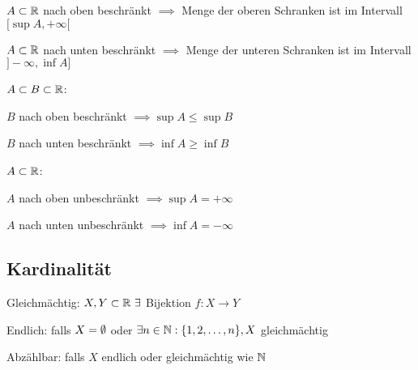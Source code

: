 \begin{compactenum}
    \item $A \subset \mathbb{R}$ nach oben beschränkt $\implies$ Menge der oberen Schranken ist  im Intervall $[\sup A, +\infty[$
    \item $A \subset \mathbb{R}$ nach unten beschränkt $\implies$ Menge der unteren Schranken ist  im Intervall $]-\infty, \inf A]$
\end{compactenum}

$A \subset  B \subset  \mathbb{R}$:
\begin{compactenum}
    \item $B$ nach oben beschränkt $\implies \sup A \le \sup B$
    \item $B$ nach unten beschränkt $\implies \inf A \ge \inf B$
\end{compactenum}

$A \subset \mathbb{R}$:
\begin{compactenum}
    \item $A$ nach oben unbeschränkt $\implies \sup A = +\infty$
    \item $A$ nach unten unbeschränkt $\implies \inf A = -\infty$
\end{compactenum}

\subsection{Kardinalität}
\begin{compactdesc}
    \item[Gleichmächtig:] $X,Y \subset \mathbb{R} \ \exists$ Bijektion $f : X \to Y$
    \item[Endlich:] falls $X = \emptyset$ oder $\exists n \in \mathbb{N}: \{1, 2, \ldots, n\}, X$ gleichmächtig
    \item[Abzählbar:] falls $X$ endlich oder gleichmächtig wie $\mathbb{N}$
\end{compactdesc}

